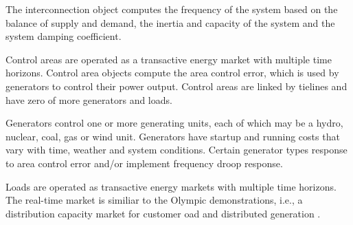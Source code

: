 The interconnection object computes the frequency of the system based on the balance of supply and demand, the inertia and capacity of the system and the system damping coefficient.

Control areas are operated as a transactive energy market with multiple time horizons.  Control area objects compute the area control error, which is used by generators to control their power output.  Control areas are linked by tielines and have zero of more generators and loads.

Generators control one or more generating units, each of which may be a hydro, nuclear, coal, gas or wind unit.  Generators have startup and running costs that vary with time, weather and system conditions. Certain generator types response to area control error and/or implement frequency droop response. 

Loads are operated as transactive energy markets with multiple time horizons. The real-time market is similiar to the Olympic demonstrations, i.e., a distribution capacity market for customer oad and distributed generation \cite{hammerstrom2007}.
